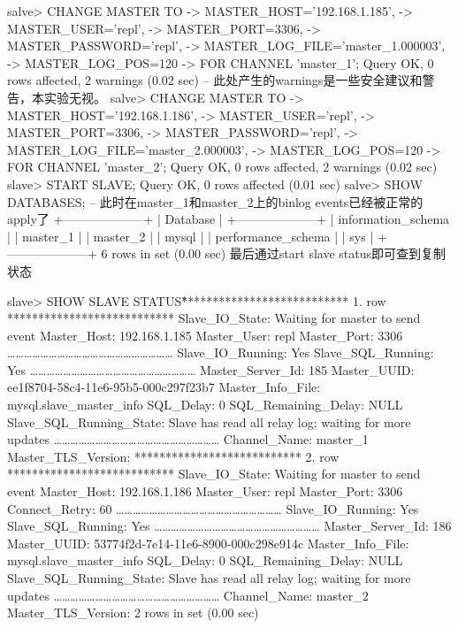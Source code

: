 salve> CHANGE MASTER TO 
    -> MASTER_HOST='192.168.1.185',
    -> MASTER_USER='repl',
    -> MASTER_PORT=3306,
    -> MASTER_PASSWORD='repl',
    -> MASTER_LOG_FILE='master_1.000003',
    -> MASTER_LOG_POS=120
    -> FOR CHANNEL 'master_1';
Query OK, 0 rows affected, 2 warnings (0.02 sec)    -- 此处产生的warnings是一些安全建议和警告，本实验无视。
salve> CHANGE MASTER TO
    -> MASTER_HOST='192.168.1.186',
    -> MASTER_USER='repl',
    -> MASTER_PORT=3306,
    -> MASTER_PASSWORD='repl',
    -> MASTER_LOG_FILE='master_2.000003',
    -> MASTER_LOG_POS=120
    -> FOR CHANNEL 'master_2';
Query OK, 0 rows affected, 2 warnings (0.02 sec)
slave> START SLAVE;
Query OK, 0 rows affected (0.01 sec)
salve> SHOW DATABASES;    -- 此时在master_1和master_2上的binlog events已经被正常的apply了
+--------------------+
| Database            |
+--------------------+
| information_schema |
| master_1           |
| master_2           |
| mysql             |
| performance_schema |
| sys                |
+--------------------+
6 rows in set (0.00 sec)
最后通过start slave status即可查到复制状态

slave> SHOW SLAVE STATUS\G
*************************** 1. row ***************************
               Slave_IO_State: Waiting for master to send event
                  Master_Host: 192.168.1.185
                  Master_User: repl
                  Master_Port: 3306
                ……………………………………………………
             Slave_IO_Running: Yes
            Slave_SQL_Running: Yes
                ……………………………………………………
             Master_Server_Id: 185
                  Master_UUID: ee1f8704-58c4-11e6-95b5-000c297f23b7
             Master_Info_File: mysql.slave_master_info
                    SQL_Delay: 0
          SQL_Remaining_Delay: NULL
      Slave_SQL_Running_State: Slave has read all relay log; waiting for more updates
               ……………………………………………………
                 Channel_Name: master_1
           Master_TLS_Version:
*************************** 2. row ***************************
               Slave_IO_State: Waiting for master to send event
                  Master_Host: 192.168.1.186
                  Master_User: repl
                  Master_Port: 3306
                Connect_Retry: 60
               ……………………………………………………
             Slave_IO_Running: Yes
            Slave_SQL_Running: Yes
               ……………………………………………………
             Master_Server_Id: 186
                  Master_UUID: 53774f2d-7e14-11e6-8900-000c298e914c
             Master_Info_File: mysql.slave_master_info
                    SQL_Delay: 0
          SQL_Remaining_Delay: NULL
      Slave_SQL_Running_State: Slave has read all relay log; waiting for more updates
               ……………………………………………………
                 Channel_Name: master_2
           Master_TLS_Version:
2 rows in set (0.00 sec)
 

